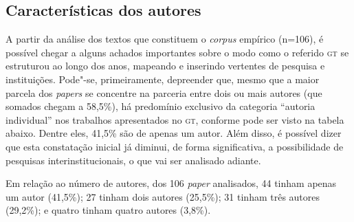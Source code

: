 \subsection{Características dos autores}

A partir da análise dos textos que constituem o \emph{corpus} empírico
(n=106), é possível chegar a alguns achados importantes sobre o modo
como o referido \textsc{gt} se estruturou ao longo dos anos, mapeando e inserindo
vertentes de pesquisa e instituições. Pode"-se, primeiramente, depreender
que, mesmo que a maior parcela dos \emph{papers} se concentre na
parceria entre dois ou mais autores (que somados chegam a 58,5\%), há
predomínio exclusivo da categoria ``autoria individual'' nos trabalhos
apresentados no \textsc{gt}, conforme pode ser visto na tabela abaixo. Dentre
eles, 41,5\% são de apenas um autor. Além disso, é possível dizer
que esta constatação inicial já diminui, de forma significativa, a
possibilidade de pesquisas interinstitucionais, o que vai ser analisado
adiante.

Em relação ao número de autores, dos 106 \textit{paper} analisados, 44 tinham apenas um autor (41,5\%); 27 tinham dois autores (25,5\%); 31 tinham três autores (29,2\%); e quatro tinham quatro autores (3,8\%).

